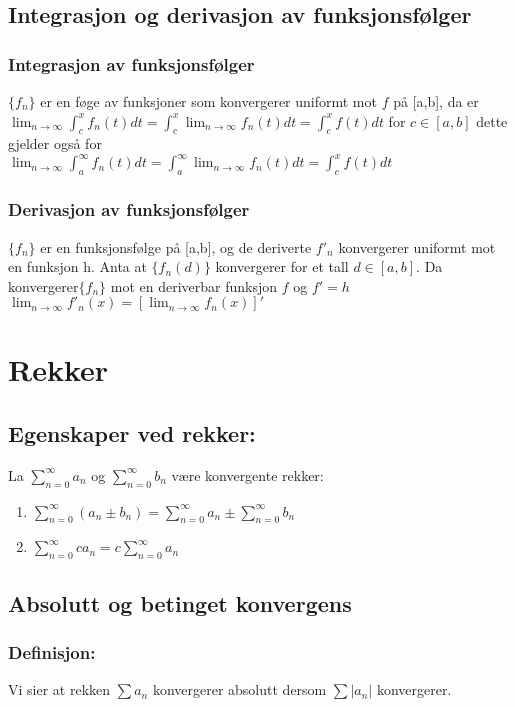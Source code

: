 \documentclass[12pt,a4paper,twocolumn,twoside]{article}
\def\abs#1{\lvert #1 \rvert}
\begin{document}
        \subsection*{Integrasjon og derivasjon av funksjonsfølger}
            \subsubsection*{Integrasjon av funksjonsfølger}
            $\{f_n\}$ er en føge av funksjoner som konvergerer uniformt mot $f$ på [a,b], da er $\lim_{n\to\infty}\int_c^x f_n(t)dt = \int_c^x\lim_{n\to\infty}f_n(t)dt=\int_c^xf(t)dt$
            for $c \in [a,b]$ dette gjelder også for\\ $\lim_{n\to\infty}\int_a^\infty f_n(t)dt = \int_a^\infty\lim_{n\to\infty}f_n(t)dt=\int_c^xf(t)dt$
            \subsubsection*{Derivasjon av funksjonsfølger}
            $\{f_n\}$ er en funksjonsfølge på [a,b], og de deriverte $f'_n$ konvergerer uniformt mot en funksjon h. Anta 
            at $\{f_n(d)\}$ konvergerer for et tall $d\in [a,b]$. Da konvergerer$\{f_n\}$ mot en deriverbar funksjon $f$ og $f'=h$\\
            $\lim_{n\to\infty}f'_n(x)=[\lim_{n\to\infty}f_n(x)]'$
            
    \section*{Rekker}
        \subsection*{Egenskaper ved rekker:}
        La $\sum_{n=0}^\infty a_n$ og $\sum_{n=0}^\infty b_n$ være konvergente rekker:
        \begin{enumerate}[topsep = 0pt,partopsep = 0pt, itemsep = 0cm]
            \item $\sum_{n=0}^\infty (a_n \pm b_n) = \sum_{n=0}^\infty a_n \pm \sum_{n=0}^\infty b_n$
            \item $\sum_{n=0}^\infty ca_n=c\sum_{n=0}^\infty a_n$
        \end{enumerate}
        \subsection*{Absolutt og betinget konvergens}
        \subsubsection*{Definisjon:} 
        Vi sier at rekken $\sum a_n$ konvergerer absolutt dersom $\sum\abs{a_n}$ konvergerer.
\end{document}

